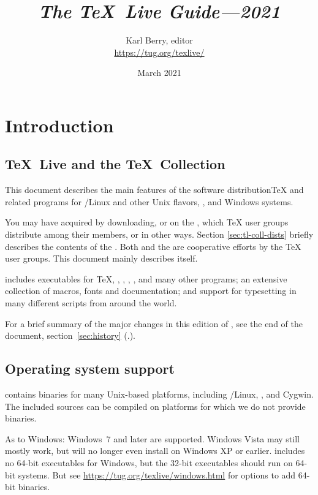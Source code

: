 \documentclass{article}
\title{%
  {\huge \textit{The \TeX\ Live Guide---2021}}
}
\author{Karl Berry, editor \\[3mm]
        \url{https://tug.org/texlive/}
       }
\date{March 2021}
\begin{document}
\maketitle

\begin{multicols}{2}
\tableofcontents
\end{multicols}

\section{Introduction}
\label{sec:intro}

\subsection{\protect\TeX\protect\ Live and the \protect\TeX\protect\ Collection}

This document describes the main features of the \TL{} software
distribution\Dash \TeX{} and related programs for \GNU/Linux
and other Unix flavors, \MacOSX, and Windows systems.

You may have acquired \TL{} by downloading, or on the \TK{} \DVD, which
\TeX{} user groups distribute among their members, or in other ways.
Section \ref{sec:tl-coll-dists} briefly describes the contents of the
\DVD.  Both \TL{} and the \TK{} are cooperative efforts by the \TeX{}
user groups. This document mainly describes \TL{} itself.

\TL{} includes executables for \TeX{}, \LaTeXe{}, \ConTeXt,
\MF, \MP, \BibTeX{} and many other programs; an extensive collection
of macros, fonts and documentation; and support for typesetting in
many different scripts from around the world.

For a brief summary of the major changes in this edition of \TL{},
see the end of the document, section~\ref{sec:history}
(\p.\pageref{sec:history}).


\subsection{Operating system support}
\label{sec:os-support}

\TL{} contains binaries for many Unix-based platforms, including
\GNU/Linux, \MacOSX, and Cygwin.  The included sources can be compiled
on platforms for which we do not provide binaries.

As to Windows: Windows~7 and later are supported. Windows Vista
may still mostly work, but \TL{} will no longer even install on Windows
XP or earlier.  \TL{} includes no
64-bit executables for Windows, but the 32-bit executables should
run on 64-bit systems. But see
\url{https://tug.org/texlive/windows.html} for options to add
64-bit binaries.
\end{document}
